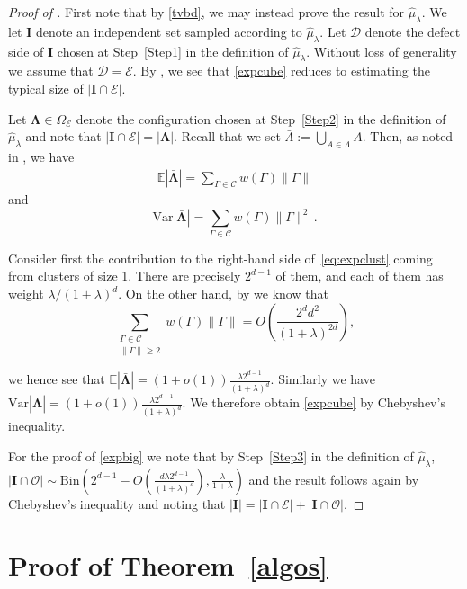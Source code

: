 \documentclass[10pt,a4paper]{amsart}
\theoremstyle{definition}
\newcommand{\cO}{\mathcal{O} }
\newcommand{\cC}{\mathcal{C} }
\newcommand{\cD}{\mathcal{D} }
\newcommand{\cE}{\mathcal{E} }
\newcommand{\nin}[0]{\noindent}
\newcommand{\0}[0]{\emptyset}
\newcommand{\lam}{\lambda}
\begin{document}
\begin{proof}[Proof of ]
    First note that by \eqref{tvbd}, we may instead prove the result for $\hat\mu_\lam$. We let $\mathbf{I}$ denote an independent set sampled according to $\hat\mu_\lam$. Let $\cD$ denote the defect side of $\mathbf{I}$ chosen at Step~\ref{Step1} in the definition of $\hat\mu_\lam$. Without loss of generality we assume that $\cD=\cE$.
By , we see that \eqref{expcube} reduces to estimating the typical size of $|\mathbf{I}\cap \cE|$. 

Let $\mathbf{\Lambda}\in \Omega_\cE$ denote the  configuration chosen at Step~\ref{Step2} in the definition of $\hat\mu_\lam$ and note that $|\mathbf{I}\cap \cE|= |\mathbf{\Lambda}|$. Recall that we set $\bar\Lambda:=\bigcup_{A\in\Lambda}A$. Then, as noted in \cite{struct}, we have
\begin{align} \label{eq:expclust}
\mathbb{E} |\mathbf{\mathbf{\bar \Lambda}}| = \sum_{\Gamma\in \cC} w(\Gamma)\|\Gamma\| 
\end{align}
and
\[ \text{Var} |\mathbf{\bar \Lambda}| = \sum_{\Gamma\in\cC} w(\Gamma) \|\Gamma\|^2\, . \]

Consider first the contribution to the right-hand side of~\eqref{eq:expclust} coming from clusters of size 1. There are precisely $2^{d-1}$ of them, and each of them has weight $\lam/(1+\lam)^d$.    On the other hand, by  we know that
\[ \sum_{\substack{\Gamma\in\cC \\ \|\Gamma\|\geq 2}} w(\Gamma)\|\Gamma\| =O\left(\frac{2^d d^2}{(1+\lam)^{2d}} \right),\]

\nin    we hence see that $\mathbb{E} |\mathbf{\bar \Lambda}| = (1+o(1))\frac{\lam 2^{d-1}}{(1+\lam)^d}$. Similarly we have $\text{Var} |\mathbf{\bar \Lambda}| = (1+o(1))\frac{\lam 2^{d-1}}{(1+\lam)^d}$.
      We therefore obtain \eqref{expcube} by Chebyshev's inequality.
    
    For the proof of \eqref{expbig} we note that by Step~\ref{Step3} in the definition of $\hat\mu_\lam$,  $|\mathbf{I}\cap\cO|\sim\text{Bin}\left(2^{d-1}-O\left(\frac{d\lam 2^{d-1}}{(1+\lam)^d}\right), \frac{\lam}{1+\lam}\right)$ and the result follows again by Chebyshev's inequality and noting that $|\mathbf{I}|=|\mathbf{I} \cap \cE|+|\mathbf{I}\cap \cO|$.
\end{proof}

\section{Proof of Theorem~\ref{algos}}\label{pfthmalgos}
\end{document}
